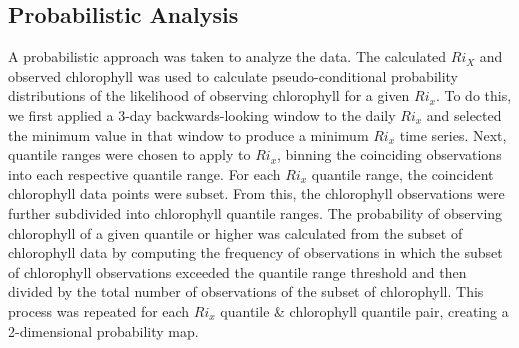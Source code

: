 \documentclass[preprint,review,12pt]{elsarticle}
\begin{document}
\subsection{Probabilistic Analysis}
A probabilistic approach was taken to analyze the data. The calculated \(Ri_X\) and observed chlorophyll was used to calculate pseudo-conditional probability distributions of the likelihood of observing chlorophyll for a given \(Ri_x\). To do this, we first applied a 3-day backwards-looking window to the daily \(Ri_x\) and selected the minimum value in that window to produce a minimum \(Ri_x\) time series. Next, quantile ranges were chosen to apply to \(Ri_x\), binning the coinciding observations into each respective quantile range. For each \(Ri_x\) quantile range, the coincident chlorophyll data points were subset. From this, the chlorophyll observations were further subdivided into chlorophyll quantile ranges. The probability of observing chlorophyll of a given quantile or higher was calculated from the subset of chlorophyll data by computing the frequency of observations in which the subset of chlorophyll observations exceeded the quantile range threshold and then divided by the total number of observations of the subset of chlorophyll. This process was repeated for each \(Ri_x\) quantile & chlorophyll quantile pair, creating a 2-dimensional probability map. 
\end{document}

